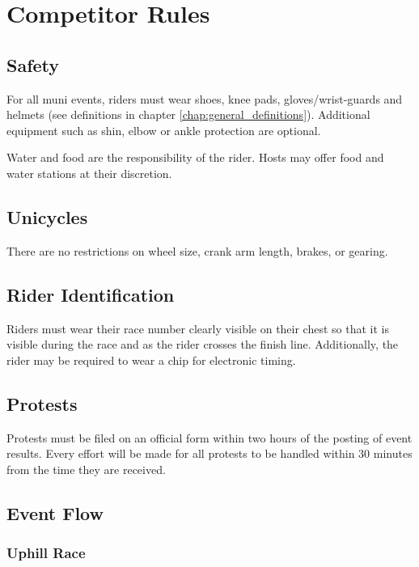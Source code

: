 \chapter{Competitor Rules}

\section{Safety}
For all muni events, riders must wear shoes, knee pads, gloves/wrist-guards and helmets (see definitions in chapter \ref{chap:general_definitions}). Additional equipment such as shin, elbow or ankle protection are optional.

Water and food are the responsibility of the rider. Hosts may offer food and water stations at their discretion.

\section{Unicycles}

There are no restrictions on wheel size, crank arm length, brakes, or gearing.

\section{Rider Identification}

Riders must wear their race number clearly visible on their chest so that it is visible during the race and as the rider crosses the finish line.
Additionally, the rider may be required to wear a chip for electronic timing.

\section{Protests}

Protests must be filed on an official form within two hours of the posting of event results.
Every effort will be made for all protests to be handled within 30 minutes from the time they are received.

\section{Event Flow}

\subsection{Uphill Race \label{sec:muni_uphill}}

